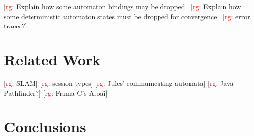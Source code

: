 \documentclass[a4paper]{article}
\newcommand{\todo}[2]{{\small [\textcolor{red}{#1}: #2]}}
\newcommand{\rg}[1]{\todo{rg}{#1}}
\theoremstyle{remark}
\begin{document}
\rg{Explain how some automaton bindings may be dropped.}
\rg{Explain how some deterministic automaton states must be dropped for convergence.}
\rg{error traces?}

\section{Related Work} %

\rg{SLAM}
\rg{session types}
\rg{Jules' communicating automata}
\rg{Java Pathfinder?}
\rg{Frama-C's Aroa\"\i}

\section{Conclusions} %



\end{document}
